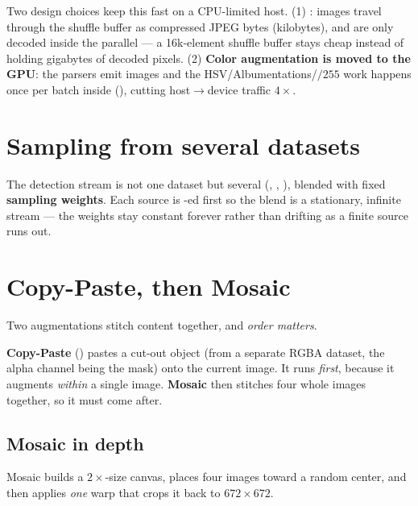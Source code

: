 \begin{hood}
Two design choices keep this fast on a CPU-limited host. (1) \textbf{}:
images travel through the shuffle buffer as compressed JPEG bytes (kilobytes), and are
only decoded inside the parallel  --- a 16k-element shuffle buffer stays cheap
instead of holding gigabytes of decoded pixels. (2) \textbf{Color augmentation is moved
to the GPU}: the parsers emit  images and the HSV/Albumentations/$/255$ work
happens once per batch inside  (),
cutting host$\rightarrow$device traffic $4\times$.
\end{hood}

\section{Sampling from several datasets}
The detection stream is not one dataset but several (,
, ), blended with fixed
\textbf{sampling weights}. Each source is -ed first so the blend is a
stationary, infinite stream --- the weights stay constant forever rather than drifting as
a finite source runs out.

\section{Copy-Paste, then Mosaic}
Two augmentations stitch content together, and \emph{order matters}.

\textbf{Copy-Paste} () pastes a cut-out object (from a separate RGBA
dataset, the alpha channel being the mask) onto the current image. It runs \emph{first},
because it augments \emph{within} a single image. \textbf{Mosaic} then stitches four
whole images together, so it must come after.


\subsection{Mosaic in depth}
Mosaic builds a $2\times$-size canvas, places four images toward a random center, and then
applies \emph{one}  warp that crops it back to $672\times672$.

